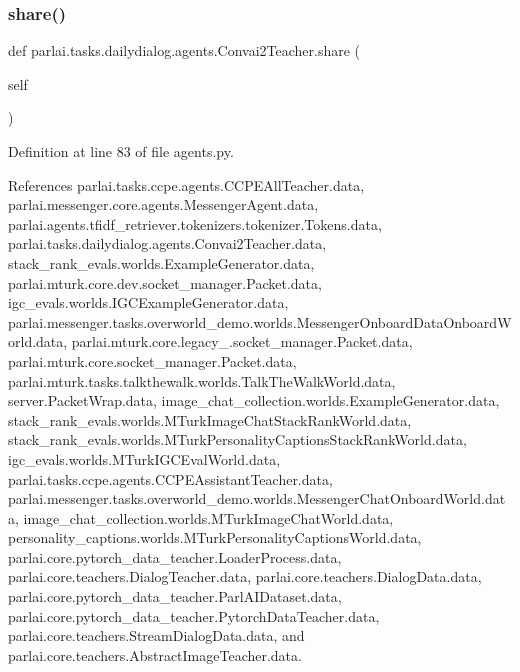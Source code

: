 \subsubsection{\texorpdfstring{share()}{share()}}
{\footnotesize\ttfamily def parlai.\+tasks.\+dailydialog.\+agents.\+Convai2\+Teacher.\+share (\begin{DoxyParamCaption}\item[{}]{self }\end{DoxyParamCaption})}



Definition at line 83 of file agents.\+py.



References parlai.\+tasks.\+ccpe.\+agents.\+C\+C\+P\+E\+All\+Teacher.\+data, parlai.\+messenger.\+core.\+agents.\+Messenger\+Agent.\+data, parlai.\+agents.\+tfidf\+\_\+retriever.\+tokenizers.\+tokenizer.\+Tokens.\+data, parlai.\+tasks.\+dailydialog.\+agents.\+Convai2\+Teacher.\+data, stack\+\_\+rank\+\_\+evals.\+worlds.\+Example\+Generator.\+data, parlai.\+mturk.\+core.\+dev.\+socket\+\_\+manager.\+Packet.\+data, igc\+\_\+evals.\+worlds.\+I\+G\+C\+Example\+Generator.\+data, parlai.\+messenger.\+tasks.\+overworld\+\_\+demo.\+worlds.\+Messenger\+Onboard\+Data\+Onboard\+World.\+data, parlai.\+mturk.\+core.\+legacy\+\_.\+socket\+\_\+manager.\+Packet.\+data, parlai.\+mturk.\+core.\+socket\+\_\+manager.\+Packet.\+data, parlai.\+mturk.\+tasks.\+talkthewalk.\+worlds.\+Talk\+The\+Walk\+World.\+data, server.\+Packet\+Wrap.\+data, image\+\_\+chat\+\_\+collection.\+worlds.\+Example\+Generator.\+data, stack\+\_\+rank\+\_\+evals.\+worlds.\+M\+Turk\+Image\+Chat\+Stack\+Rank\+World.\+data, stack\+\_\+rank\+\_\+evals.\+worlds.\+M\+Turk\+Personality\+Captions\+Stack\+Rank\+World.\+data, igc\+\_\+evals.\+worlds.\+M\+Turk\+I\+G\+C\+Eval\+World.\+data, parlai.\+tasks.\+ccpe.\+agents.\+C\+C\+P\+E\+Assistant\+Teacher.\+data, parlai.\+messenger.\+tasks.\+overworld\+\_\+demo.\+worlds.\+Messenger\+Chat\+Onboard\+World.\+data, image\+\_\+chat\+\_\+collection.\+worlds.\+M\+Turk\+Image\+Chat\+World.\+data, personality\+\_\+captions.\+worlds.\+M\+Turk\+Personality\+Captions\+World.\+data, parlai.\+core.\+pytorch\+\_\+data\+\_\+teacher.\+Loader\+Process.\+data, parlai.\+core.\+teachers.\+Dialog\+Teacher.\+data, parlai.\+core.\+teachers.\+Dialog\+Data.\+data, parlai.\+core.\+pytorch\+\_\+data\+\_\+teacher.\+Parl\+A\+I\+Dataset.\+data, parlai.\+core.\+pytorch\+\_\+data\+\_\+teacher.\+Pytorch\+Data\+Teacher.\+data, parlai.\+core.\+teachers.\+Stream\+Dialog\+Data.\+data, and parlai.\+core.\+teachers.\+Abstract\+Image\+Teacher.\+data.



